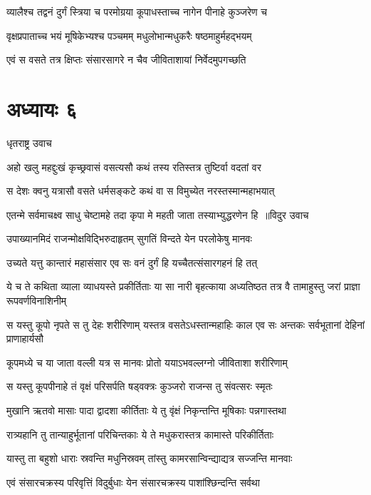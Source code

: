 \twolineshloka
{व्यालैश्च तद्वनं दुर्गं स्त्रिया च परमोग्रया}
{कूपाधस्ताच्च नागेन पीनाहे कुञ्जरेण च}


\twolineshloka
{वृक्षप्रपाताच्च भयं मूषिकेभ्यश्च पञ्चमम्}
{मधुलोभान्मधुकरैः षष्ठमाहुर्महद्भयम्}


\twolineshloka
{एवं स वसते तत्र क्षिप्तः संसारसागरे}
{न चैव जीविताशायां निर्वेदमुपगच्छति}


\chapter{अध्यायः ६}
\twolineshloka
{धृतराष्ट्र उवाच}
{}


\twolineshloka
{अहो खलु महद्दुःखं कृच्छ्रवासं वसत्यसौ}
{कथं तस्य रतिस्तत्र तुष्टिर्वा वदतां वर}


\twolineshloka
{स देशः क्वनु यत्रासौ वसते धर्मसङ्कटे}
{कथं वा स विमुच्येत नरस्तस्मान्महाभयात्}


\threelineshloka
{एतन्मे सर्वमाचक्ष्व साधु चेष्टामहे तदा}
{कृपा मे महती जाता तस्याभ्युद्धरणेन हि ॥विदुर उवाच}
{}


\twolineshloka
{उपाख्यानमिदं राजन्मोक्षविद्भिरुदाहृतम्}
{सुगतिं विन्दते येन परलोकेषु मानवः}


\twolineshloka
{उच्यते यत्तु कान्तारं महासंसार एव सः}
{वनं दुर्गं हि यच्चैतत्संसारगहनं हि तत्}


ये च ते कथिता व्याला व्याधयस्ते प्रकीर्तिताः
\twolineshloka
{या सा नारी बृहत्काया अध्यतिष्ठत तत्र वै}
{तामाहुस्तु जरां प्राज्ञा रूपवर्णविनाशिनीम्}


\threelineshloka
{स यस्तु कूपो नृपते स तु देहः शरीरिणाम्}
{यस्तत्र वसतेऽधस्तान्महाहिः काल एव सः}
{अन्तकः सर्वभूतानां देहिनां प्राणाहार्यसौ}


\twolineshloka
{कूपमध्ये च या जाता वल्ली यत्र स मानवः}
{प्रोतो ययाऽभवल्लग्नो जीविताशा शरीरिणाम्}


\twolineshloka
{स यस्तु कूपपीनाहे तं वृक्षं परिसर्पति}
{षड्वक्त्रः कुञ्जरो राजन्स तु संवत्सरः स्मृतः}


\twolineshloka
{मुखानि ऋतवो मासाः पादा द्वादशा कीर्तिताः}
{ये तु वृंक्षं निकृन्तन्ति मूषिकाः पन्नगास्तथा}


\twolineshloka
{रात्र्यहानि तु तान्याहुर्भूतानां परिचिन्तकाः}
{ये ते मधुकरास्तत्र कामास्ते परिकीर्तिताः}


\twolineshloka
{यास्तु ता बहुशो धाराः स्रवन्ति मधुनिस्रवम्}
{तांस्तु कामरसान्विन्द्याद्यत्र सज्जन्ति मानवाः}


\twolineshloka
{एवं संसारचक्रस्य परिवृत्तिं विदुर्बुधाः}
{येन संसारचक्रस्य पाशांश्छिन्दन्ति सर्वथा}


